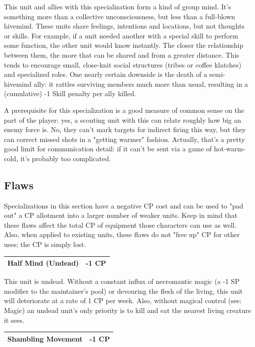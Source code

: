 \documentclass[12pt,a4paper,twocolumn]{article}
\begin{document}
This unit and allies with this specialization form a kind of group mind.  It's something more than a collective unconsciousness, but less than a full-blown hivemind.  These units share feelings, intentions and locations, but not thoughts or skills.  For example, if a unit needed another with a special skill to perform some function, the other unit would know instantly.  The closer the relationship between them, the more that can be shared and from a greater distance.  This tends to encourage small, close-knit social structures (tribes or coffee klatches) and specialized roles.  One nearly certain downside is the death of a semi-hivemind ally: it rattles surviving members much more than usual, resulting in a (cumulative) -1 Skill penalty per ally killed.

A prerequisite for this specialization is a good measure of common sense on the part of the player: yes, a scouting unit with this can relate roughly how big an enemy force is.  No, they can't mark targets for indirect firing this way, but they can correct missed shots in a "getting warmer" fashion.  Actually, that's a pretty good limit for communication detail: if it can't be sent via a game of hot-warm-cold, it's probably too complicated.

\subsection{Flaws}

Specializations in this section have a negative CP cost and can be used to "pad out" a CP allotment into a larger number of weaker units.  Keep in mind that these flaws affect the total CP of equipment those characters can use as well.  Also, when applied to existing units, these flaws do not "free up" CP for other uses; the CP is simply lost.

\begin{tabular}{|l|c|} \hline
Half Mind (Undead) & -1 CP \\ \hline
\end{tabular}

This unit is undead.  Without a constant influx of necromantic magic (a -1 SP modifier to the maintainer's pool) or devouring the flesh of the living, this unit will deteriorate at a rate of 1 CP per week.  Also, without magical control (see: Magic) an undead unit's only priority is to kill and eat the nearest living creature it sees.

\begin{tabular}{|l|c|} \hline
Shambling Movement & -1 CP \\ \hline
\end{tabular}
\end{document}
